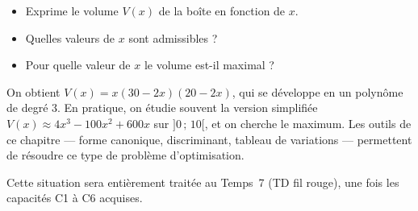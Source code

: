 \begin{itemize}
  \item Exprime le volume $V(x)$ de la boîte en fonction de $x$.
  \item Quelles valeurs de $x$ sont admissibles ?
  \item Pour quelle valeur de $x$ le volume est-il maximal ?
\end{itemize}

On obtient $V(x) = x(30 - 2x)(20 - 2x)$, qui se développe en un polynôme de degré 3. En pratique, on étudie souvent la version simplifiée $V(x) \approx 4x^3 - 100x^2 + 600x$ sur $]0\,;\,10[$, et on cherche le maximum. Les outils de ce chapitre — forme canonique, discriminant, tableau de variations — permettent de résoudre ce type de problème d'optimisation.

Cette situation sera entièrement traitée au Temps~7 (TD fil rouge), une fois les capacités C1 à C6 acquises.
